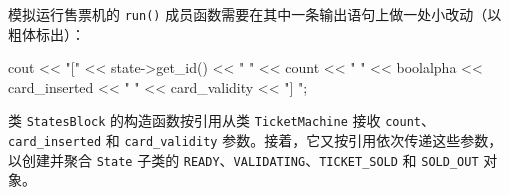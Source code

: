 \par
{}\par
{}\par
{}\par

模拟运行售票机的 \texttt{run()} 成员函数需要在其中一条输出语句上做一处小改动（以粗体标出）：

\begin{codebox}
        cout << "[" << state->get_id() << " " << count
             << " " << boolalpha << card_inserted
             << " " << card_validity << "] ";
\end{codebox}

类 \texttt{States\allowbreak{}Block} 的构造函数按引用从类 \texttt{Ticket\allowbreak{}Machine} 接收 \texttt{count}、\texttt{card\_\allowbreak{}inserted} 和 \texttt{card\_\allowbreak{}validity} 参数。接着，它又按引用依次传递这些参数，以创建并聚合 \texttt{State} 子类的 \texttt{READY}、\texttt{VALIDATING}、\texttt{TICKET\_\allowbreak{}SOLD} 和 \texttt{SOLD\_OUT} 对象。

